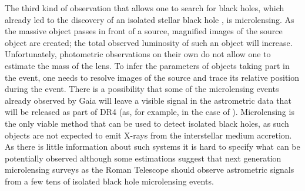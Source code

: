 \documentclass{pracalicmgr}
\begin{document}
The third kind of observation that allows one to search for black holes, which already led to the discovery of an isolated stellar black hole \citep{sahu_isolated_2022},
is microlensing. As the massive object passes in front of a source, magnified images of the source object are created; the total observed luminosity of such an object will
increase. Unfortunately, photometric observations on their own do not allow one to estimate the mass of the lens. To infer the parameters of objects taking
part in the event, one needs to resolve images of the source and trace its relative position during the event. 
There is a possibility that some of the microlensing events already observed by Gaia will leave a visible signal in the astrometric data
that will be released as part of DR4 (as, for example, in the case of \citet{kruszynska_lens_2022}). Microlensing is the only viable method that can be used to detect
isolated black holes, as such objects are not expected to emit X-rays from the interstellar medium accretion. As there is little information about such systems it is hard
to specify what can be potentially observed although some estimations \citep{sajadian_detecting_2023} suggest that next generation microlensing surveys as the Roman Telescope should
observe astrometric signals from a few tens of isolated black hole microlensing events.
\end{document}
